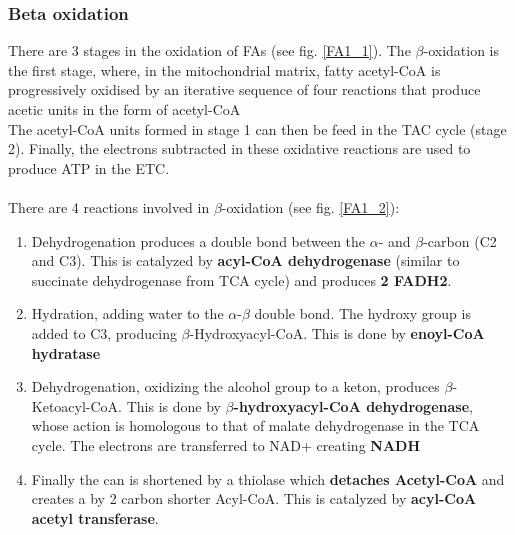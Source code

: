 \documentclass[../main.tex]{subfiles}
\begin{document}
\subsubsection{Beta oxidation}
There are 3 stages in the oxidation of FAs (see fig. \ref{FA1_1}). The $\beta$-oxidation is the first stage, where, in the mitochondrial matrix, fatty acetyl-CoA is progressively oxidised by an iterative sequence of four reactions that produce acetic units in the form of acetyl-CoA \\
The acetyl-CoA units formed in stage 1 can then be feed in the TAC cycle (stage 2). Finally, the electrons subtracted in these oxidative reactions are used to produce ATP in the ETC. \\
\\
There are 4 reactions involved in $\beta$-oxidation (see fig. \ref{FA1_2}): 
\begin{enumerate}
	\item Dehydrogenation produces a double bond between the $\alpha$- and $\beta$-carbon (C2 and C3). This is catalyzed by \textbf{acyl-CoA dehydrogenase} (similar to succinate dehydrogenase from TCA cycle) and produces \textbf{2 FADH2}.
	\item Hydration, adding water to the $\alpha$-$\beta$ double bond. The hydroxy group is added to C3, producing $\beta$-Hydroxyacyl-CoA. This is done by \textbf{enoyl-CoA hydratase}
	\item Dehydrogenation, oxidizing the alcohol group to a keton, produces $\beta$-Ketoacyl-CoA. This is done by \textbf{$\beta$-hydroxyacyl-CoA dehydrogenase}, whose action is homologous to that of malate dehydrogenase in the TCA cycle. The electrons are transferred to NAD+ creating \textbf{NADH}
	\item Finally the can is shortened by a thiolase which \textbf{detaches Acetyl-CoA} and creates a by 2 carbon shorter Acyl-CoA. This is catalyzed by \textbf{acyl-CoA acetyl transferase}. 
\end{enumerate}
\end{document}
